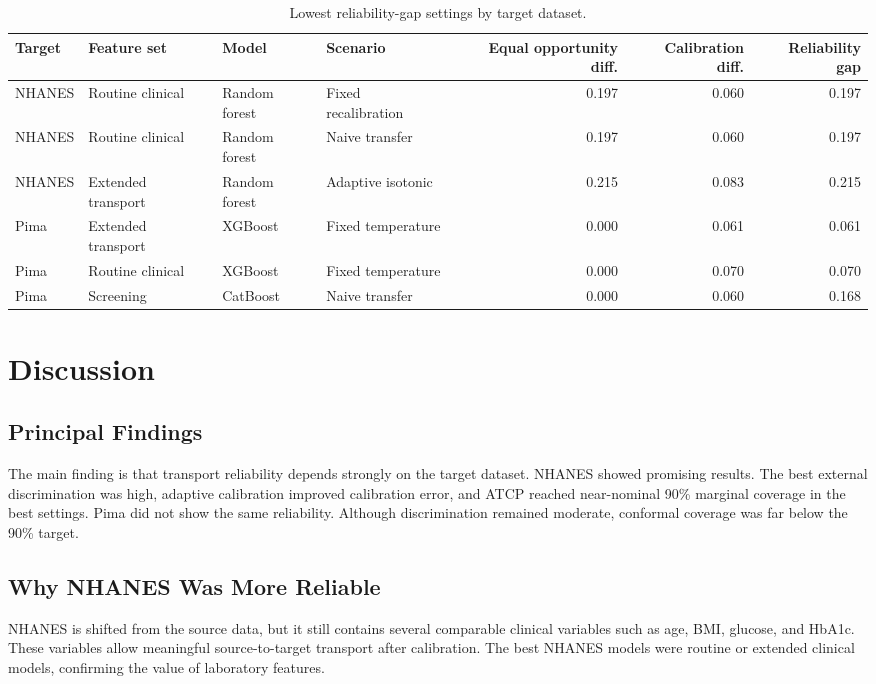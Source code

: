 \documentclass[11pt]{article}
\begin{document}
\begin{table}[H]
\centering
\caption{Lowest reliability-gap settings by target dataset.}
\label{tab:fairness}
\begin{adjustbox}{width=\textwidth}
\begin{tabular}{llllrrr}
\toprule
Target & Feature set & Model & Scenario & Equal opportunity diff. & Calibration diff. & Reliability gap \\
\midrule
NHANES & Routine clinical & Random forest & Fixed recalibration & 0.197 & 0.060 & 0.197 \\
NHANES & Routine clinical & Random forest & Naive transfer & 0.197 & 0.060 & 0.197 \\
NHANES & Extended transport & Random forest & Adaptive isotonic & 0.215 & 0.083 & 0.215 \\
Pima & Extended transport & XGBoost & Fixed temperature & 0.000 & 0.061 & 0.061 \\
Pima & Routine clinical & XGBoost & Fixed temperature & 0.000 & 0.070 & 0.070 \\
Pima & Screening & CatBoost & Naive transfer & 0.000 & 0.060 & 0.168 \\
\bottomrule
\end{tabular}
\end{adjustbox}
\end{table}

\section{Discussion}
\subsection{Principal Findings}
The main finding is that transport reliability depends strongly on the target dataset. NHANES showed promising results. The best external discrimination was high, adaptive calibration improved calibration error, and ATCP reached near-nominal 90\% marginal coverage in the best settings. Pima did not show the same reliability. Although discrimination remained moderate, conformal coverage was far below the 90\% target.

\subsection{Why NHANES Was More Reliable}
NHANES is shifted from the source data, but it still contains several comparable clinical variables such as age, BMI, glucose, and HbA1c. These variables allow meaningful source-to-target transport after calibration. The best NHANES models were routine or extended clinical models, confirming the value of laboratory features.
\end{document}
